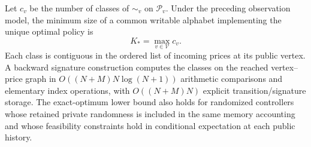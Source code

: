 \begin{theorem}\label{thm:minimal}
Let $c_v$ be the number of classes of $\sim_v$ on $\mathcal P_v$. Under the preceding observation model, the minimum size of a common writable alphabet implementing the unique optimal policy is
\begin{equation}\label{eq:minimal-alphabet}
 K_* = \max_{v\in\mathcal V}c_v.
\end{equation}
Each class is contiguous in the ordered list of incoming prices at its public vertex. A backward signature construction computes the classes on the reached vertex--price graph in $O((N+M)N\log(N+1))$ arithmetic comparisons and elementary index operations, with $O((N+M)N)$ explicit transition/signature storage. The exact-optimum lower bound also holds for randomized controllers whose retained private randomness is included in the same memory accounting and whose feasibility constraints hold in conditional expectation at each public history.
\end{theorem}
